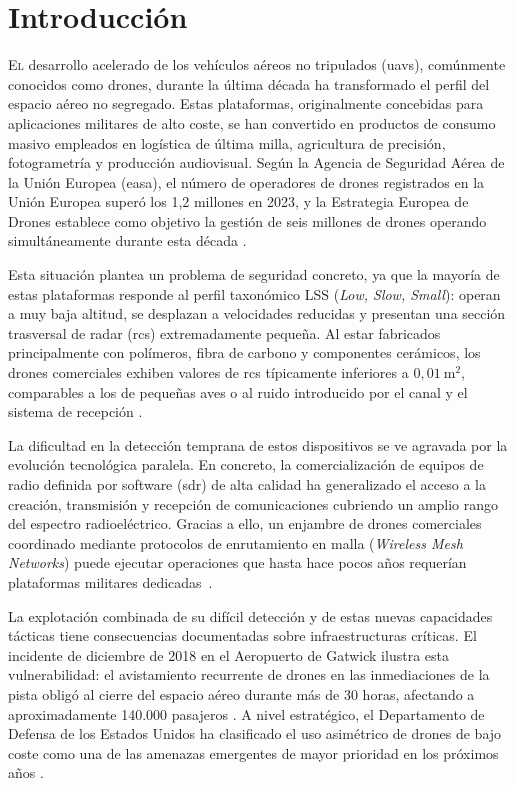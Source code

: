 \chapter{Introducción}
\label{cap:introduccion}

\lettrine{E}{l} desarrollo acelerado de los vehículos aéreos no tripulados (\glspl{uav}), comúnmente conocidos como drones, durante la última década ha transformado el perfil del espacio aéreo no segregado. Estas plataformas, originalmente concebidas para aplicaciones militares de alto coste, se han convertido en productos de consumo masivo empleados en logística de última milla, agricultura de precisión, fotogrametría y producción audiovisual. Según la Agencia de Seguridad Aérea de la Unión Europea (\gls{easa}), el número de operadores de drones registrados en la Unión Europea superó los 1,2 millones en 2023, y la Estrategia Europea de Drones establece como objetivo la gestión de seis millones de drones operando simultáneamente durante esta década \cite{easa_drones_2023}.

Esta situación plantea un problema de seguridad concreto, ya que la mayoría de estas plataformas responde al perfil taxonómico LSS (\textit{Low, Slow, Small}): operan a muy baja altitud, se desplazan a velocidades reducidas y presentan una sección trasversal de radar (\gls{rcs}) extremadamente pequeña. Al estar fabricados principalmente con polímeros, fibra de carbono y componentes cerámicos, los drones comerciales exhiben valores de \gls{rcs} típicamente inferiores a $0{,}01~\text{m}^2$, comparables a los de pequeñas aves o al ruido introducido por el canal y el sistema de recepción \cite{semkin_analyzing_2020}.

La dificultad en la detección temprana de estos dispositivos se ve agravada por la evolución tecnológica paralela. En concreto, la comercialización de equipos de radio definida por software (\gls{sdr}) de alta calidad ha generalizado el acceso a la creación, transmisión y recepción de comunicaciones cubriendo un amplio rango del espectro radioeléctrico. Gracias a ello, un enjambre de drones comerciales coordinado mediante protocolos de enrutamiento en malla (\textit{Wireless Mesh Networks}) puede ejecutar operaciones que hasta hace pocos años requerían plataformas militares dedicadas~\cite{lacy_machine_2024}.

La explotación combinada de su difícil detección y de estas nuevas capacidades tácticas tiene consecuencias documentadas sobre infraestructuras críticas. El incidente de diciembre de 2018 en el Aeropuerto de Gatwick ilustra esta vulnerabilidad: el avistamiento recurrente de drones en las inmediaciones de la pista obligó al cierre del espacio aéreo durante más de 30 horas, afectando a aproximadamente 140.000 pasajeros \cite{dft_taking_flight_2019}. A nivel estratégico, el Departamento de Defensa de los Estados Unidos ha clasificado el uso asimétrico de drones de bajo coste como una de las amenazas emergentes de mayor prioridad en los próximos años \cite{dod_cuas_2021}.

